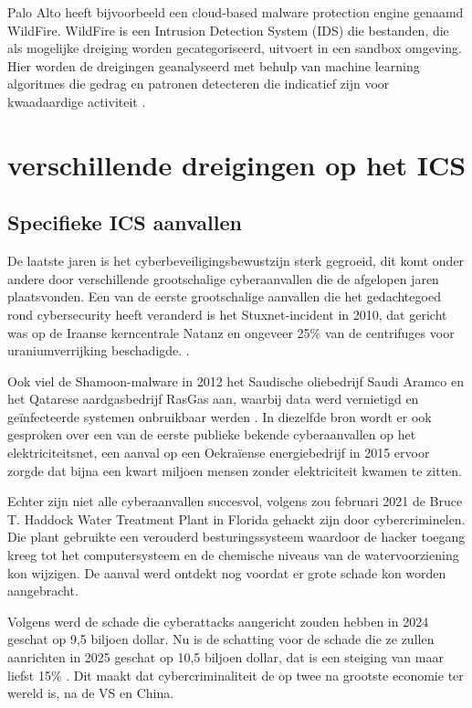 Palo Alto heeft bijvoorbeeld een cloud-based malware protection engine genaamd WildFire. WildFire is een Intrusion Detection System (IDS) die bestanden, die als mogelijke dreiging worden gecategoriseerd, uitvoert in een sandbox omgeving. Hier worden de dreigingen geanalyseerd met behulp van machine learning algoritmes die gedrag en patronen detecteren die indicatief zijn voor kwaadaardige activiteit \autocite{PaloAltoWF2024}.




\section{verschillende dreigingen op het ICS}

\subsection{Specifieke ICS aanvallen}

De laatste jaren is het cyberbeveiligingsbewustzijn sterk gegroeid, dit komt onder andere door verschillende grootschalige cyberaanvallen die de afgelopen jaren plaatsvonden. Een van de eerste grootschalige aanvallen die het gedachtegoed rond cybersecurity heeft veranderd is het Stuxnet-incident in 2010, dat gericht was op de Iraanse kerncentrale Natanz en ongeveer 25\% van de centrifuges voor uraniumverrijking beschadigde. \autocite{Zetter2014}. 

Ook viel de Shamoon-malware in 2012 het Saudische oliebedrijf Saudi Aramco en het Qatarese aardgasbedrijf RasGas aan, waarbij data werd vernietigd en geïnfecteerde systemen onbruikbaar werden \autocite{Hemsley2018}.
In diezelfde bron wordt er ook gesproken over een van de eerste publieke bekende cyberaanvallen op het elektriciteitsnet, een aanval op een Oekraïense energiebedrijf in 2015 ervoor zorgde dat bijna een kwart miljoen mensen zonder elektriciteit kwamen te zitten.

Echter zijn niet alle cyberaanvallen succesvol, volgens \textcite{Margolin2021} zou februari 2021 de Bruce T. Haddock Water Treatment Plant in Florida gehackt zijn door cybercriminelen. Die plant gebruikte een verouderd besturingssysteem waardoor de hacker toegang kreeg tot het computersysteem en de chemische niveaus van de watervoorziening kon wijzigen. De aanval werd ontdekt nog voordat er grote schade kon worden aangebracht.



Volgens \textcite{Morgan2024} werd de schade die cyberattacks aangericht zouden hebben in 2024 geschat op 9,5 biljoen dollar. Nu is de schatting voor de schade die ze zullen aanrichten in 2025 geschat op 10,5 biljoen dollar, dat is een steiging van maar liefst 15\% . Dit maakt dat cybercriminaliteit de op twee na grootste economie ter wereld is, na de VS en China.


